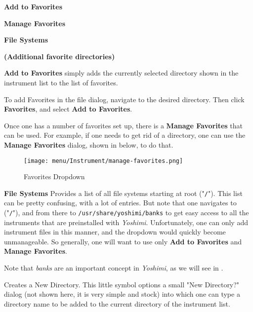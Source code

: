    \begin{enumber}
      \item \textbf{Add to Favorites}
      \item \textbf{Manage Favorites}
      \item \textbf{File Systems}
      \item \textbf{(Additional favorite directories)}
   \end{enumber}

   \textbf{Add to Favorites} 
   simply adds the currently selected directory shown in the instrument list
   to the list of favorites.

   To add Favorites in the file dialog, navigate to the desired directory.
   Then click \textbf{Favorites}, and select \textbf{Add to Favorites}.

   Once one has a number of favorites set up,
   there is a \textbf{Manage Favorites} that can be used.
   For example, if one needs to get rid of a directory, one can use the
   \textbf{Manage Favorites}
   dialog, shown in
    below,
   to do that.

\begin{figure}[H]
   \centering 
   \texttt{[image: menu/Instrument/manage-favorites.png]}
   \caption{Favorites Dropdown}
   \label{fig:manage_instrument_favorites}
\end{figure}

   \textbf{File Systems} 
   Provides a list of all file systems starting at root ("\texttt{/}").
   This list can be pretty confusing, with a lot of entries.
   But note that one navigates to ("\texttt{/}"), and from there to
   \texttt{/usr/share/yoshimi/banks} to get easy access to all the
   instruments that are preinstalled with
   \textsl{Yoshimi}.  Unfortunately, one can only add instrument
   files in this manner, and the dropdown would quickly become
   unmanageable.  So generally, one will want to use only
   \textbf{Add to Favorites} and \textbf{Manage Favorites}.

   Note that \textsl{banks} are an important concept in
   \textsl{Yoshimi}, as we will see in
   .

   Creates a New Directory.
   This little symbol options a small "New Directory?" dialog (not shown
   here, it is very simple and stock) into which one can type a directory
   name to be added to the current directory of the instrument list.

